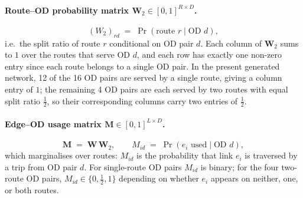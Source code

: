 \documentclass[11pt]{article}
\begin{document}
\paragraph{Route--OD probability matrix
    $\mathbf{W}_2 \in [0,1]^{R \times D}$.}
\begin{equation}
    (W_2)_{rd} \;=\; \Pr(\text{route } r \mid \text{OD } d),
    \label{eq:W2}
\end{equation}
i.e.\ the split ratio of route $r$ conditional on OD pair $d$.
Each column of $\mathbf{W}_2$ sums to $1$ over the routes that serve OD $d$,
and each row has exactly one non-zero entry since each route belongs to a
single OD pair. In the present generated network, 12 of the 16 OD pairs are served by a
single route, giving a column entry of $1$; the remaining 4 OD pairs are each
served by two routes with equal split ratio $\tfrac{1}{2}$, so their
corresponding columns carry two entries of $\tfrac{1}{2}$.

\paragraph{Edge--OD usage matrix $\mathbf{M} \in [0,1]^{L \times D}$.}
\begin{equation}
    \mathbf{M} \;=\; \mathbf{W}\,\mathbf{W}_2,
    \qquad
    M_{id} \;=\; \Pr(e_i \text{ used} \mid \text{OD } d),
    \label{eq:M}
\end{equation}
which marginalises over routes: $M_{id}$ is the probability that link $e_i$
is traversed by a trip from OD pair $d$. For single-route OD pairs $M_{id}$
is binary; for the four two-route OD pairs, $M_{id} \in \{0, \tfrac{1}{2}, 1\}$
depending on whether $e_i$ appears on neither, one, or both routes.
\end{document}
